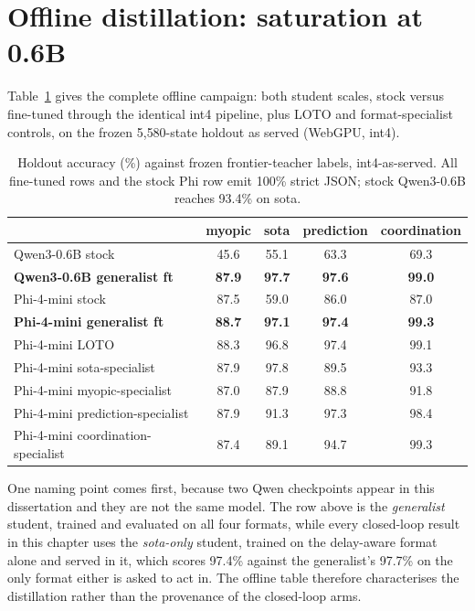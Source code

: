\section{Offline distillation: saturation at 0.6B}\label{sec:res-offline}
Table~\ref{tab:offline-full} gives the complete offline campaign: both
student scales, stock versus fine-tuned through the identical int4
pipeline, plus LOTO and format-specialist controls, on the frozen
5{,}580-state holdout as served (WebGPU, int4).

\begin{table}[t]
\caption{Holdout accuracy (\%) against frozen frontier-teacher labels,
int4-as-served. All fine-tuned rows and the stock Phi row emit 100\% strict JSON; stock
Qwen3-0.6B reaches 93.4\% on sota.}
\label{tab:offline-full}
\centering
\small
\begin{tabular}{lcccc}
\toprule
 & myopic & sota & prediction & coordination \\
\midrule
Qwen3-0.6B stock & 45.6 & 55.1 & 63.3 & 69.3 \\
\textbf{Qwen3-0.6B generalist ft} & \textbf{87.9} & \textbf{97.7} & \textbf{97.6} & \textbf{99.0} \\
Phi-4-mini stock & 87.5 & 59.0 & 86.0 & 87.0 \\
\textbf{Phi-4-mini generalist ft} & \textbf{88.7} & \textbf{97.1} & \textbf{97.4} & \textbf{99.3} \\
Phi-4-mini LOTO & 88.3 & 96.8 & 97.4 & 99.1 \\
Phi-4-mini sota-specialist & 87.9 & 97.8 & 89.5 & 93.3 \\
Phi-4-mini myopic-specialist & 87.0 & 87.9 & 88.8 & 91.8 \\
Phi-4-mini prediction-specialist & 87.9 & 91.3 & 97.3 & 98.4 \\
Phi-4-mini coordination-specialist & 87.4 & 89.1 & 94.7 & 99.3 \\
\bottomrule
\end{tabular}
\end{table}



One naming point comes first, because two Qwen checkpoints appear in
this dissertation and they are not the same model. The row above is the
\emph{generalist} student, trained and evaluated on all four formats,
while every closed-loop result in this chapter uses the \emph{sota-only}
student, trained on the delay-aware format alone and served in it, which
scores 97.4\% against the generalist's 97.7\% on the only format either is
asked to act in. The offline table therefore characterises the
distillation rather than the provenance of the closed-loop arms.

